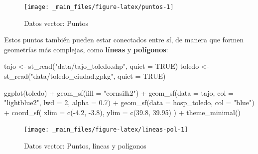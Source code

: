 \documentclass[
]{report}
\newenvironment{Shaded}{\begin{snugshade}}{\end{snugshade}}
\newcommand{\AttributeTok}[1]{\textcolor[rgb]{0.77,0.63,0.00}{#1}}
\newcommand{\ConstantTok}[1]{\textcolor[rgb]{0.00,0.00,0.00}{#1}}
\newcommand{\DecValTok}[1]{\textcolor[rgb]{0.00,0.00,0.81}{#1}}
\newcommand{\FloatTok}[1]{\textcolor[rgb]{0.00,0.00,0.81}{#1}}
\newcommand{\FunctionTok}[1]{\textcolor[rgb]{0.00,0.00,0.00}{#1}}
\newcommand{\NormalTok}[1]{#1}
\newcommand{\OtherTok}[1]{\textcolor[rgb]{0.56,0.35,0.01}{#1}}
\newcommand{\SpecialCharTok}[1]{\textcolor[rgb]{0.00,0.00,0.00}{#1}}
\newcommand{\StringTok}[1]{\textcolor[rgb]{0.31,0.60,0.02}{#1}}
\begin{document}
\begin{figure}

{\centering \texttt{[image: \_main\_files/figure-latex/puntos-1]} 

}

\caption{Datos vector: Puntos}\label{fig:puntos}
\end{figure}

Estos puntos también pueden estar conectados entre sí, de manera que formen
geometrías más complejas, como \textbf{líneas} y \textbf{polígonos}:

\begin{Shaded}
\begin{Highlighting}[]

\NormalTok{tajo }\OtherTok{\textless{}{-}} \FunctionTok{st\_read}\NormalTok{(}\StringTok{"data/tajo\_toledo.shp"}\NormalTok{, }\AttributeTok{quiet =} \ConstantTok{TRUE}\NormalTok{)}
\NormalTok{toledo }\OtherTok{\textless{}{-}} \FunctionTok{st\_read}\NormalTok{(}\StringTok{"data/toledo\_ciudad.gpkg"}\NormalTok{, }\AttributeTok{quiet =} \ConstantTok{TRUE}\NormalTok{)}


\FunctionTok{ggplot}\NormalTok{(toledo) }\SpecialCharTok{+}
  \FunctionTok{geom\_sf}\NormalTok{(}\AttributeTok{fill =} \StringTok{"cornsilk2"}\NormalTok{) }\SpecialCharTok{+}
  \FunctionTok{geom\_sf}\NormalTok{(}\AttributeTok{data =}\NormalTok{ tajo, }\AttributeTok{col =} \StringTok{"lightblue2"}\NormalTok{, }\AttributeTok{lwd =} \DecValTok{2}\NormalTok{, }\AttributeTok{alpha =} \FloatTok{0.7}\NormalTok{) }\SpecialCharTok{+}
  \FunctionTok{geom\_sf}\NormalTok{(}\AttributeTok{data =}\NormalTok{ hosp\_toledo, }\AttributeTok{col =} \StringTok{"blue"}\NormalTok{) }\SpecialCharTok{+}
  \FunctionTok{coord\_sf}\NormalTok{(}
    \AttributeTok{xlim =} \FunctionTok{c}\NormalTok{(}\SpecialCharTok{{-}}\FloatTok{4.2}\NormalTok{, }\SpecialCharTok{{-}}\FloatTok{3.8}\NormalTok{),}
    \AttributeTok{ylim =} \FunctionTok{c}\NormalTok{(}\FloatTok{39.8}\NormalTok{, }\FloatTok{39.95}\NormalTok{)}
\NormalTok{  ) }\SpecialCharTok{+}
  \FunctionTok{theme\_minimal}\NormalTok{()}
\end{Highlighting}
\end{Shaded}

\begin{figure}

{\centering \texttt{[image: \_main\_files/figure-latex/lineas-pol-1]} 

}

\caption{Datos vector: Puntos, líneas y polígonos}\label{fig:lineas-pol}
\end{figure}
\end{document}
